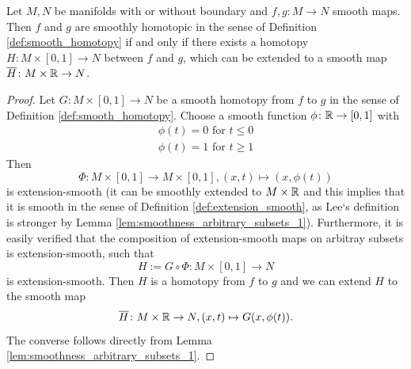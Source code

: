 \begin{lemma}
    \label{misc:lem:different_def_smooth_homotopy_equivalence}
    Let $M,N$ be manifolds with or without boundary and $f,g \colon M \to N$ smooth maps. Then $f$ and $g$ are smoothly homotopic in the sense of Definition \ref{def:smooth_homotopy} if and only if there exists a homotopy $H \colon M \times [0,1] \to N$ between $f$ and $g$, which can be extended to a smooth map $\overline{H} \colon M \times \mathbb{R} \to N$.
\end{lemma}

\begin{proof}[Proof]
    Let $G \colon M \times [0,1] \to N$ be a smooth homotopy from $f$ to $g$ in the sense of Definition \ref{def:smooth_homotopy}. Choose a smooth function $\phi \colon \mathbb{R} \to [0,1]$ with
    \begin{gather*}
        \phi(t) = 0 \text{ for } t \leq 0 \\
        \phi(t) = 1 \text{ for } t \geq 1
    \end{gather*}
    Then 
    \[
        \Phi \colon M \times [0,1] \to M \times [0,1], (x,t) \mapsto (x,\phi(t))
    \]
    is extension-smooth (it can be smoothly extended to $M \times \mathbb{R}$ and this implies that it is smooth in the sense of Definition \ref{def:extension_smooth}, as Lee`s definition is stronger by Lemma \ref{lem:smoothness_arbitrary_subsets_1}). Furthermore, it is easily verified that the composition of extension-smooth maps on arbitray subsets is extension-smooth, such that 
    \[
    H := G \circ \Phi \colon M \times [0,1] \to N
    \] 
    is extension-smooth. Then $H$ is a homotopy from $f$ to $g$ and we can extend $H$ to the smooth map 
    \[
        \overline{H} \colon M \times \mathbb{R} \to N, (x,t) \mapsto G(x,\phi(t)).
    \]
    The converse follows directly from Lemma \ref{lem:smoothness_arbitrary_subsets_1}.
    
\end{proof}
